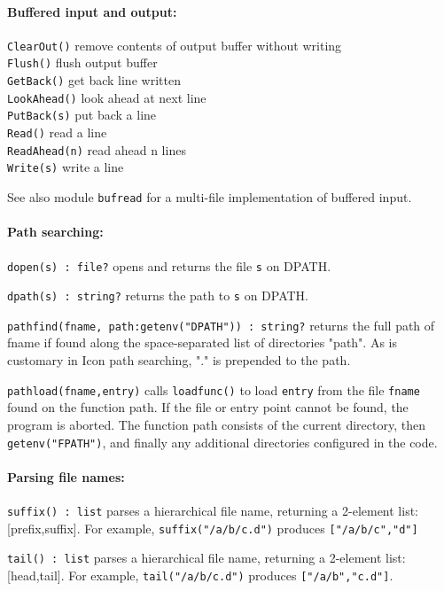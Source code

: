 \paragraph{Buffered input and output:}
\texttt{ClearOut()} remove contents of output buffer without
writing\\
\texttt{Flush()} flush output buffer\\
\texttt{GetBack()} get back line written\\
\texttt{LookAhead()} look ahead at next line\\
\texttt{PutBack(s)} put back a line\\
\texttt{Read()} read a line\\
\texttt{ReadAhead(n)} read ahead n lines\\
\texttt{Write(s)} write a line

See also module \texttt{bufread} for a multi-file implementation of
buffered input.

\paragraph{Path searching:}
\texttt{dopen(s) : file?} opens and returns the file \texttt{s} on
DPATH.

\texttt{dpath(s) : string?} returns the path to \texttt{s} on DPATH.

\texttt{pathfind(fname,
path:getenv("DPATH")) : string?} returns
the full path of fname if found along the space-separated list of
directories "path". As is customary in Icon
path searching, "." is prepended to the
path.

\texttt{pathload(fname,entry)} calls \texttt{loadfunc()} to load
\texttt{entry} from the file \texttt{fname} found on the function path.
If the file or entry point cannot be found, the program is aborted. The
function path consists of the current directory, then
\texttt{getenv("FPATH")}, and finally any
additional directories configured in the code.

\paragraph[Parsing file names:]{Parsing file names:}
\texttt{suffix() : list} parses a hierarchical file name, returning a
2-element list: [prefix,suffix]. For example,
\texttt{suffix("/a/b/c.d")} produces
\texttt{["/a/b/c","d"]}

\texttt{tail() : list} parses a hierarchical file name, returning a
2-element list: [head,tail]. For example,
\texttt{tail("/a/b/c.d")} produces
\texttt{["/a/b","c.d"]}.

